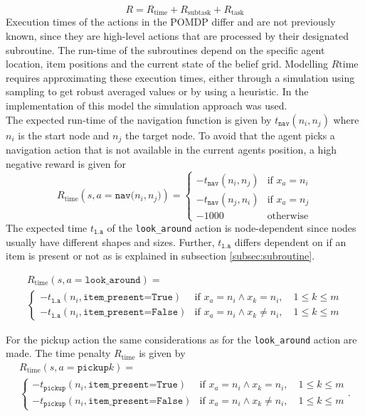 \begin{equation}
    R = R_{\text{time}} + R_{\text{subtask}} + R_{\text{task}} 
\end{equation}
Execution times of the actions in the POMDP differ and are not previously known, since they are high-level actions that are processed by their designated subroutine. The run-time of the subroutines depend on the specific agent location, item positions and the current state of the belief grid. Modelling $R\text{time}$ requires approximating these execution times, either through a simulation using sampling to get robust averaged values or by using a heuristic. In the implementation of this model the simulation approach was used.\\
The expected run-time of the navigation function is given by $t_\texttt{nav}(n_i, n_j)$ where $n_i$ is the start node and $n_j$ the target node. To avoid that the agent picks a navigation action that is not available in the current agents position, a high negative reward is given for 
\begin{equation}
    R_\text{time}(s, a=\texttt{nav($n_i, n_j$)}) = \begin{cases}
    -t_\texttt{nav}(n_i, n_j) & \text{if } x_a=n_i\\
    -t_\texttt{nav}(n_j, n_i) & \text{if } x_a=n_j\\
    -1000 & \text{otherwise}
    \end{cases}
\end{equation}
The expected time $t_\texttt{l.a}$ of the \texttt{look\_around} action is node-dependent since nodes usually have different shapes and sizes. Further, $t_\texttt{l.a}$ differs dependent on if an item is present or not as is explained in subsection \ref{subsec:subroutine}. 

\begin{multline}
    R_\text{time}(s, a=\texttt{look\_around}) = \\\begin{cases}
    -t_\texttt{l.a}(n_i, \texttt{item\_present=True}) & \text{if }x_a=n_i \land x_k=n_i, \quad 1\leq k \leq m\\
    -t_\texttt{l.a}(n_i, \texttt{item\_present=False}) & \text{if }x_a=n_i \land x_k \neq n_i,\quad  1\leq k \leq m
    \end{cases}
\end{multline}

For the pickup action  the same considerations as for the \texttt{look\_around} action are made. The time penalty $R_\text{time}$ is given by
\begin{multline}
    R_\text{time}(s, a=\texttt{pickup}k) = \\ \begin{cases}
    -t_\texttt{pickup}(n_i, \texttt{item\_present=True}) & \text{if }x_a=n_i \land x_k=n_i, \quad 1\leq k \leq m\\
    -t_\texttt{pickup}(n_i, \texttt{item\_present=False}) & \text{if }x_a=n_i \land x_k \neq n_i,\quad  1\leq k \leq m
    \end{cases}.
\end{multline}

